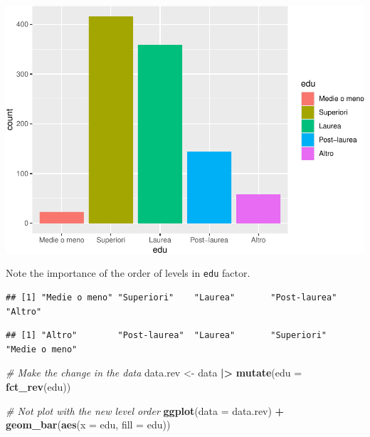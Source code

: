 \documentclass[
]{book}
\newenvironment{Shaded}{\begin{snugshade}}{\end{snugshade}}
\newcommand{\AttributeTok}[1]{\textcolor[rgb]{0.13,0.29,0.53}{#1}}
\newcommand{\CommentTok}[1]{\textcolor[rgb]{0.56,0.35,0.01}{\textit{#1}}}
\newcommand{\FunctionTok}[1]{\textcolor[rgb]{0.13,0.29,0.53}{\textbf{#1}}}
\newcommand{\NormalTok}[1]{#1}
\newcommand{\OtherTok}[1]{\textcolor[rgb]{0.56,0.35,0.01}{#1}}
\newcommand{\SpecialCharTok}[1]{\textcolor[rgb]{0.81,0.36,0.00}{\textbf{#1}}}
\begin{document}
\includegraphics{R-for-social-research-and-business-analytics_files/figure-latex/unnamed-chunk-26-1.pdf}

Note the importance of the order of levels in \texttt{edu} factor.

\begin{Shaded}
\end{Shaded}

\begin{verbatim}
## [1] "Medie o meno" "Superiori"    "Laurea"       "Post-laurea"  "Altro"
\end{verbatim}

\begin{Shaded}
\end{Shaded}

\begin{verbatim}
## [1] "Altro"        "Post-laurea"  "Laurea"       "Superiori"    "Medie o meno"
\end{verbatim}

\begin{Shaded}
\begin{Highlighting}[]
\CommentTok{\# Make the change in the data}
\NormalTok{data.rev }\OtherTok{\textless{}{-}}\NormalTok{ data }\SpecialCharTok{|\textgreater{}} 
  \FunctionTok{mutate}\NormalTok{(}\AttributeTok{edu =} \FunctionTok{fct\_rev}\NormalTok{(edu))}

\CommentTok{\# Not plot with the new level order}
\FunctionTok{ggplot}\NormalTok{(}\AttributeTok{data =}\NormalTok{ data.rev) }\SpecialCharTok{+}
  \FunctionTok{geom\_bar}\NormalTok{(}\FunctionTok{aes}\NormalTok{(}\AttributeTok{x =}\NormalTok{ edu, }\AttributeTok{fill =}\NormalTok{ edu))}
\end{Highlighting}
\end{Shaded}
\end{document}
